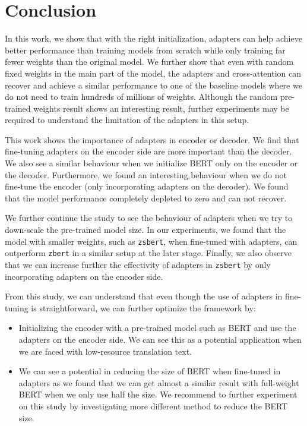 \chapter*{Conclusion}
In this work, we show that with the right initialization, adapters can help achieve better performance than training models from scratch while only training far fewer weights than the original model. We further show that even with random fixed weights in the main part of the model, the adapters and cross-attention can recover and achieve a similar performance to one of the baseline models where we do not need to train hundreds of millions of weights. Although the random pre-trained weights result shows an interesting result, further experiments may be required to understand the limitation of the adapters in this setup.

This work shows the importance of adapters in encoder or decoder. We find that fine-tuning adapters on the encoder side are more important than the decoder. We also see a similar behaviour when we initialize BERT only on the encoder or the decoder. Furthermore, we found an interesting behaviour when we do not fine-tune the encoder (only incorporating adapters on the decoder). We found that the model performance completely depleted to zero and can not recover.

We further continue the study to see the behaviour of adapters when we try to down-scale the pre-trained model size. In our experiments, we found that the model with smaller weights, such as \texttt{zsbert}, when fine-tuned with adapters, can outperform \texttt{zbert} in a similar setup at the later stage. Finally, we also observe that we can increase further the effectivity of adapters in \texttt{zsbert} by only incorporating adapters on the encoder side.

From this study, we can understand that even though the use of adapters in fine-tuning is straightforward, we can further optimize the framework by:
\begin{itemize}
    \item Initializing the encoder with a pre-trained model such as BERT and use the adapters on the encoder side. We can see this as a potential application when we are faced with low-resource translation text.
    \item We can see a potential in reducing the size of BERT when fine-tuned in adapters as we found that we can get almost a similar result with full-weight BERT when we only use half the size. We recommend to further experiment on this study by investigating more different method to reduce the BERT size.
\end{itemize}
